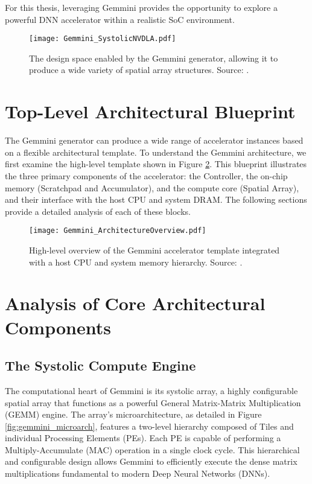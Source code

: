 For this thesis, leveraging Gemmini provides the opportunity to explore a powerful DNN accelerator within a realistic SoC environment.

\begin{figure}[h!]
    \centering
    \texttt{[image: Gemmini\_SystolicNVDLA.pdf]} 
    \caption[Architectural Flexibility of the Gemmini Generator]{The design space enabled by the Gemmini generator, allowing it to produce a wide variety of spatial array structures. Source: \cite{gemini-dac}.}
    \label{fig:gemmini_flexibility}
\end{figure}

\section{Top-Level Architectural Blueprint}
\label{sec:gemmini_blueprint}
The Gemmini generator can produce a wide range of accelerator instances based on a flexible architectural template. To understand the Gemmini architecture, we first examine the high-level template shown in Figure \ref{fig:gemmini_template}. This blueprint illustrates the three primary components of the accelerator: the Controller, the on-chip memory (Scratchpad and Accumulator), and the compute core (Spatial Array), and their interface with the host CPU and system DRAM. The following sections provide a detailed analysis of each of these blocks.

\begin{figure}[htbp]
    \centering
    \texttt{[image: Gemmini\_ArchitectureOverview.pdf]}
    \caption{High-level overview of the Gemmini accelerator template integrated with a host CPU and system memory hierarchy. Source: \cite{gemini-dac}.}
    \label{fig:gemmini_template}
\end{figure}

\section{Analysis of Core Architectural Components}
\label{sec:gemmini_components}

\subsection{The Systolic Compute Engine}
The computational heart of Gemmini is its systolic array, a highly configurable spatial array that functions as a powerful General Matrix-Matrix Multiplication (GEMM) engine. The array's microarchitecture, as detailed in Figure \ref{fig:gemmini_microarch}, features a two-level hierarchy composed of Tiles and individual Processing Elements (PEs). Each PE is capable of performing a Multiply-Accumulate (MAC) operation in a single clock cycle. This hierarchical and configurable design allows Gemmini to efficiently execute the dense matrix multiplications fundamental to modern Deep Neural Networks (DNNs).

